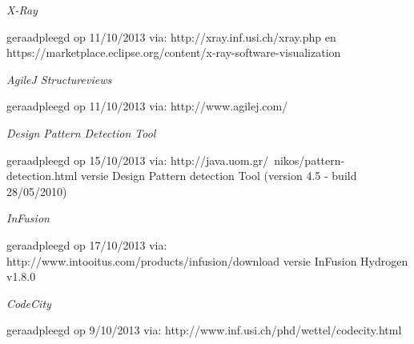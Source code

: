 \documentclass[i1]{oss}
\begin{document}
\newpage
\begin{flushleft}
\begin{thebibliography}{4}

\emph{X-Ray}
\begin{scriptsize}
geraadpleegd op 11/10/2013 via: \mbox{http://xray.inf.usi.ch/xray.php} en \mbox{https://marketplace.eclipse.org/content/x-ray-software-visualization}
\end{scriptsize}

\emph{AgileJ Structureviews}
\begin{scriptsize}
geraadpleegd op 11/10/2013 via: \mbox{http://www.agilej.com/}
\end{scriptsize}

\emph{Design Pattern Detection Tool}
\begin{scriptsize}
geraadpleegd op 15/10/2013 via: \mbox{http://java.uom.gr/~nikos/pattern-detection.html} versie  Design Pattern detection Tool (version 4.5 - build 28/05/2010)
\end{scriptsize}

\emph{InFusion}
\begin{scriptsize}
geraadpleegd op 17/10/2013 via: \mbox{http://www.intooitus.com/products/infusion/download} versie InFusion Hydrogen v1.8.0
\end{scriptsize}

\emph{CodeCity}
\begin{scriptsize}
geraadpleegd op 9/10/2013 via: \mbox{http://www.inf.usi.ch/phd/wettel/codecity.html} 
\end{scriptsize}

\end{thebibliography}
\end{flushleft}
\end{document}
